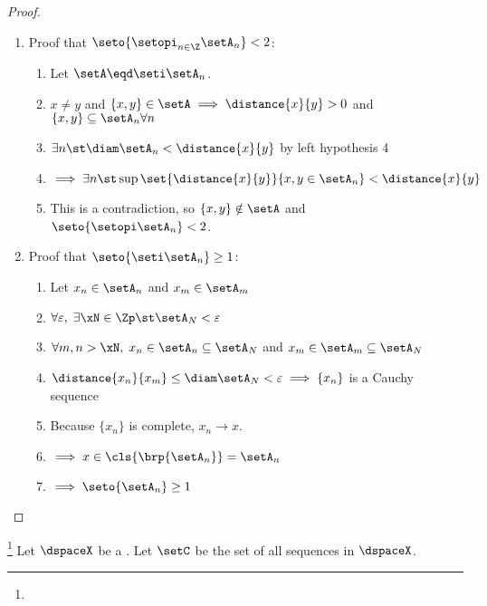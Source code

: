 \begin{proof}
\begin{enumerate}
\item Proof that $\seto{\setopi_{n\in\Z} \setA_n}<2$:
  \begin{enumerate}
    \item Let $\setA\eqd\seti \setA_n$.
    \item $x\ne y$ and $\{x,y\}\in \setA \implies \distance{x}{y}>0$ and $\{x,y\}\subseteq \setA_n \forall n$
    \item $\exists n \st \diam \setA_n < \distance{x}{y}$ by left hypothesis 4
    \item $\implies \exists n \st \sup\set{\distance{x}{y}}{x,y\in \setA_n}<\distance{x}{y}$
    \item This is a contradiction, so $\{x,y\}\notin \setA$ and $\seto{\setopi \setA_n}<2$.
  \end{enumerate}
                                                 
\item Proof that $\seto{\seti \setA_n}\ge1$:
  \begin{enumerate}
    \item Let $x_n\in \setA_n$ and $x_m\in \setA_m$
    \item $\forall \varepsilon,\; \exists\xN\in\Zp \st \setA_N < \varepsilon$
    \item $\forall m,n>\xN,\; x_n\in \setA_n\subseteq \setA_N$ and $x_m\in \setA_m\subseteq \setA_N$
    \item $\distance{x_n}{x_m}\le\diam \setA_N < \varepsilon \implies \{x_n\}$ is a Cauchy sequence
    \item Because $\{x_n\}$ is complete, $x_n\to x$.
    \item $\implies x\in \cls{\brp{\setA_n}} = \setA_n$
    \item $\implies \seto{\setA_n}\ge1$
  \end{enumerate}
\end{enumerate}
\end{proof}

\begin{definition}
\footnote{
  }
\label{def:dspace_cont}
Let $\dspaceX$ be a .
Let $\setC$ be the set of all  sequences in $\dspaceX$.
\end{definition}

